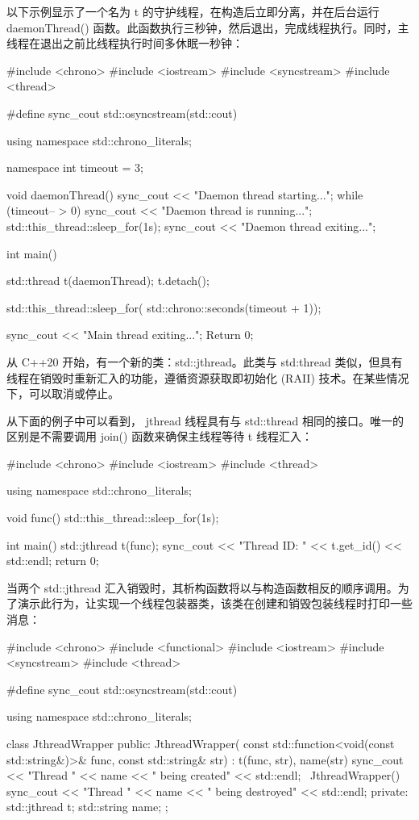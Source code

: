 以下示例显示了一个名为 t 的守护线程，在构造后立即分离，并在后台运行 daemonThread() 函数。此函数执行三秒钟，然后退出，完成线程执行。同时，主线程在退出之前比线程执行时间多休眠一秒钟：

\begin{cpp}
#include <chrono>
#include <iostream>
#include <syncstream>
#include <thread>

#define sync_cout std::osyncstream(std::cout)

using namespace std::chrono_literals;

namespace {
    int timeout = 3;
}

void daemonThread() {
    sync_cout << "Daemon thread starting...\n";
    while (timeout-- > 0) {
        sync_cout << "Daemon thread is running...\n";
        std::this_thread::sleep_for(1s);
    }
    sync_cout << "Daemon thread exiting...\n";
}

int main() {
    std::thread t(daemonThread);
    t.detach();

    std::this_thread::sleep_for(
        std::chrono::seconds(timeout + 1));

    sync_cout << "Main thread exiting...\n";
    Return 0;
}
\end{cpp}


从 C++20 开始，有一个新的类：std::jthread。此类与 std:thread 类似，但具有线程在销毁时重新汇入的功能，遵循资源获取即初始化 (RAII) 技术。在某些情况下，可以取消或停止。

从下面的例子中可以看到， jthread 线程具有与 std::thread 相同的接口。唯一的区别是不需要调用 join() 函数来确保主线程等待 t 线程汇入：

\begin{cpp}
#include <chrono>
#include <iostream>
#include <thread>

using namespace std::chrono_literals;

void func() {
    std::this_thread::sleep_for(1s);
}

int main() {
    std::jthread t(func);
    sync_cout << "Thread ID: " << t.get_id() << std::endl;
    return 0;
}
\end{cpp}

当两个 std::jthread 汇入销毁时，其析构函数将以与构造函数相反的顺序调用。为了演示此行为，让实现一个线程包装器类，该类在创建和销毁包装线程时打印一些消息：

\begin{cpp}
#include <chrono>
#include <functional>
#include <iostream>
#include <syncstream>
#include <thread>

#define sync_cout std::osyncstream(std::cout)

using namespace std::chrono_literals;

class JthreadWrapper {
public:
    JthreadWrapper(
    const std::function<void(const std::string&)>& func,
    const std::string& str)
    : t(func, str), name(str) {
        sync_cout << "Thread " << name
                  << " being created" << std::endl;
    }
    ~JthreadWrapper() {
        sync_cout << "Thread " << name
                  << " being destroyed" << std::endl;
    }
private:
    std::jthread t;
    std::string name;
};
\end{cpp}

